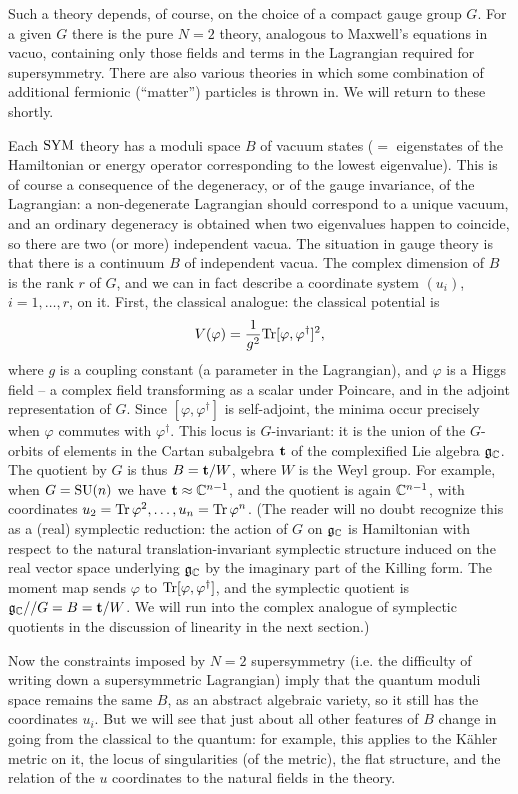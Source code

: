 Such a theory depends, of course, on the choice of a compact
gauge group $G$.
For a given $G$ there is the pure $N=2$ theory, analogous to
Maxwell's equations in vacuo, containing only those fields
and terms in the Lagrangian required for supersymmetry.
There are also various theories in which some combination of
additional fermionic (``matter'') particles is thrown in.
We will return to these shortly.

Each $\text{\rm SYM}$ theory has a moduli space $B$ of vacuum states
($=$ eigenstates of the Hamiltonian or energy operator 
corresponding to the lowest eigenvalue).
This is of course a consequence of the degeneracy, or of the
gauge invariance, of the Lagrangian: a non-degenerate Lagrangian 
should correspond to a unique vacuum, and an ordinary degeneracy 
is obtained when two eigenvalues happen to coincide, so there are 
two (or more) independent vacua. The situation in gauge theory 
is that there is a continuum $B$ of independent vacua. The 
complex dimension of $B$ is the rank $r$ of $G$, and we
can in fact describe a coordinate system $(u_i)$,
$i=1,\dotsc,r$, on it.
First, the classical analogue: the classical potential is
$$
V(\varphi)=\frac{1}{g^2}\text{\rm Tr}[\varphi,\varphi^\dagger]^2,
$$
where $g$ is a coupling constant (a parameter in the
Lagrangian), and $\varphi$ is a Higgs field -- a complex
field transforming as a scalar under Poincare, and in the
adjoint representation of $G$.
Since $[\varphi,\varphi^\dagger]$ is self-adjoint, the minima
occur precisely when $\varphi$ commutes with $\varphi^\dagger$.
This locus is $G$-invariant: it is the union of the $G$-orbits 
of elements in the Cartan subalgebra $\bold{t}$ of the complexified 
Lie algebra  $\frak{g}_{{\Bbb C}}$. 
The quotient by $G$ is thus $B=\bold{t}/W$,
where $W$ is the Weyl group. 
For example, when $G=\text{\rm SU}(n)$ we have $\bold{t}\approx
{\Bbb C}^{n-1}$, and the quotient is again ${\Bbb C}^{n-1}$, with
coordinates $u_2=\text{\rm Tr}\,\varphi^2,\dotsc,u_n=\text{\rm Tr}\,\varphi^n$.
(The reader will no doubt recognize this as a (real) 
symplectic reduction: the action of $G$ on $\frak{g}_{{\Bbb C}}$ is 
Hamiltonian with respect to the natural translation-invariant 
symplectic structure induced on  the real vector space 
underlying $\frak{g}_{{\Bbb C}}$ by the 
imaginary part of the Killing form. The moment map sends 
$\varphi$ to $\text{\rm Tr}[\varphi,\varphi^\dagger]$, and the 
symplectic quotient is  $\frak{g}_{{\Bbb C}} // G = B = \bold{t} /W$.
We will run into the complex analogue of symplectic 
quotients in the discussion of linearity in the next section.)

Now the constraints imposed by $N=2$ supersymmetry (i.e. the
difficulty of writing down a supersymmetric Lagrangian)
imply that the quantum moduli space remains the same $B$, as
an abstract algebraic variety, so it still has the
coordinates $u_i$.
But we will see that just about all other features of $B$
change in going from the classical to the quantum: 
for example, this applies to the 
K\"ahler metric on it, the locus of singularities (of the
metric), the flat structure, and the relation of the $u$
coordinates to the natural fields in the theory.

